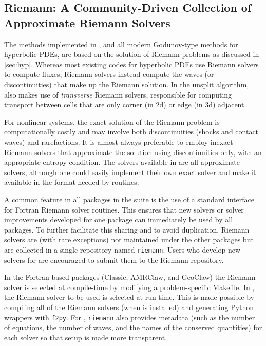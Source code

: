 %
%

\subsection{Riemann: A Community-Driven Collection of Approximate Riemann
Solvers}\label{sec:riemann}

The methods implemented in \clawpack, and all modern Godunov-type
methods for hyperbolic PDEs, are based on the solution of Riemann
problems as discussed in \cref{sec:hyp}.  Whereas most existing codes
for hyperbolic PDEs use Riemann solvers to compute fluxes, \clawpack
Riemann solvers instead compute the waves (or discontinuities) that
make up the Riemann solution.  In the unsplit algorithm, \clawpack
also makes use of {\em transverse} Riemann solvers, responsible for
computing transport between cells that are only corner (in 2d) or edge
(in 3d) adjacent.

For nonlinear systems, the exact solution of the Riemann problem is
computationally costly and may involve both discontinuities (shocks and contact
waves) and rarefactions.  It is almost always preferable to employ inexact
Riemann solvers that approximate the solution using discontinuities only, with
an appropriate entropy condition.  The solvers available in \clawpack are
all approximate solvers, although one could easily implement their own exact
solver and make it available in the format needed by \clawpack routines.

A common feature in all packages in the \clawpack suite is the
use of a standard interface for Fortran Riemann solver routines.  This ensures that new
solvers or solver improvements developed for one package can immediately
be used by all packages.  To further facilitate this sharing and to avoid
duplication, Riemann solvers are (with rare exceptions) not maintained under
the other packages but are collected in a single repository named
\texttt{riemann}.
Users who develop new solvers for \clawpack are encouraged to submit them to the
Riemann repository.

In the Fortran-based packages (Classic, AMRClaw, and GeoClaw) the Riemann solver
is selected at compile-time by modifying a problem-specific Makefile. In
\pyclaw, the Riemann solver to be used is selected at run-time.  This is made
possible by compiling all of the Riemann solvers (when \pyclaw is installed) and
generating Python wrappers with \texttt{f2py}.  For \pyclaw, \texttt{riemann}
also
provides metadata (such as the number of equations, the number of waves,
and the names of the conserved quantities) for each solver so that setup is
made more transparent.
